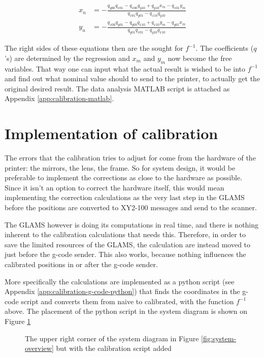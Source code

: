 \begin{align}
    x_{n} &= -\frac{q_{y00}q_{x01} - q_{x00}q_{y10} + q_{y10}x_m - q_{x01}y_m}{q_{x01}q_{y01} - q_{x10}q_{y10}} \label{eq:x-nom}\\
    y_n &= -\frac{q_{x00}q_{y01} - q_{y00}q_{x10} + q_{x10}y_m - q_{y01}x_m}{q_{y01}q_{x01} - q_{y10}q_{x10}} \label{eq:y-nom}
\end{align}

The right sides of these equations then are the sought for $f^{-1}$. The coefficients ($q$'s) are determined by the regression and $x_m$ and $y_m$ now become the free variables. That way one can input what the actual result is wished to be into $f^{-1}$ and find out what nominal value should to send to the printer, to actually get the original desired result. The data analysis MATLAB script is attached as Appendix \ref{app:calibration-matlab}.

\section{Implementation of calibration}

The errors that the calibration tries to adjust for come from the hardware of the printer: the mirrors, the lens, the frame. So for system design, it would be preferable to implement the corrections as close to the hardware as possible. Since it isn't an option to correct the hardware itself, this would mean implementing the correction calculations as the very last step in the GLAMS before the positions are converted to XY2-100 messages and send to the scanner.

The GLAMS however is doing its computations in real time, and there is nothing inherent to the calibration calculations that needs this. Therefore, in order to save the limited resources of the GLAMS, the calculation are instead moved to just before the g-code sender. This also works, because nothing influences the calibrated positions in or after the g-code sender.

More specifically the calculations are implemented as a python script (see Appendix \ref{app:calibration-g-code-python}) that finds the coordinates in the g-code script and converts them from naive to calibrated, with the function $f^{-1}$ above. The placement of the python script in the system diagram is shown on Figure \ref{fig:system-overview-w-cal}

\begin{figure}[H]
    \centering
    
    \caption{The upper right corner of the system diagram in Figure \ref{fig:system-overview} but with the calibration script added}
    \label{fig:system-overview-w-cal}
\end{figure}


